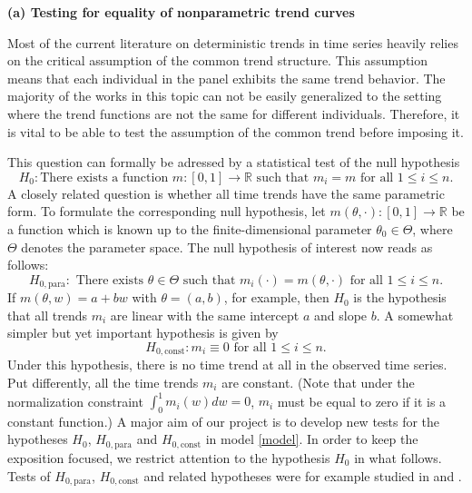 \documentclass[a4paper,12pt]{article}
\begin{document}
\noindent \textbf{(a) Testing for equality of nonparametric trend curves } 
\vspace{10pt} 

Most of the current literature on deterministic trends in time series heavily relies on the critical assumption of the common trend structure. This assumption means that each individual in the panel exhibits the same trend behavior. The majority of the works in this topic can not be easily generalized to the setting where the trend functions are not the same for different individuals. Therefore, it is vital to be able to test the assumption of the common trend before imposing it. 

This question can formally be adressed by a statistical test of the null hypothesis 
\[ H_0: \text{There exists a function } m: [0,1] \rightarrow \mathbb{R} \text{ such that } m_i = m  \text{ for all } 1 \le i \le n. \]
A closely related question is whether all time trends have the same parametric form. To formulate the corresponding null hypothesis, let $m(\theta,\cdot): [0,1] \rightarrow \mathbb{R}$ be a function which is known up to the finite-dimensional parameter $\theta_0 \in \Theta$, where $\Theta$ denotes the parameter space. The null hypothesis of interest now reads as follows:  
\[ H_{0,\text{para}}: \text{ There exists } \theta \in \Theta \text{ such that } m_i(\cdot) = m(\theta,\cdot) \text{ for all } 1 \le i \le n. \]  
If $m(\theta,w) = a + b w$ with $\theta = (a,b)$, for example, then $H_0$ is the hypothesis that all trends $m_i$ are linear with the same intercept $a$ and slope $b$. A somewhat simpler but yet important hypothesis is given by 
\[ H_{0,\text{const}}: m_i \equiv 0 \text{ for all } 1 \le i \le n. \]
Under this hypothesis, there is no time trend at all in the observed time series. Put differently, all the time trends $m_i$ are constant. (Note that under the normalization constraint $\int_0^1 m_i(w) dw = 0$, $m_i$ must be equal to zero if it is a constant function.) A major aim of our project is to develop new tests for the hypotheses $H_0$, $H_{0,\text{para}}$ and $H_{0,\text{const}}$ in model \eqref{model}. In order to keep the exposition focused, we restrict attention to the hypothesis $H_0$ in what follows. Tests of $H_{0,\text{para}}$, $H_{0,\text{const}}$ and related hypotheses were for example studied in \cite{Lyubchich2016} and \cite{ChenWu2018}. 
\end{document}
